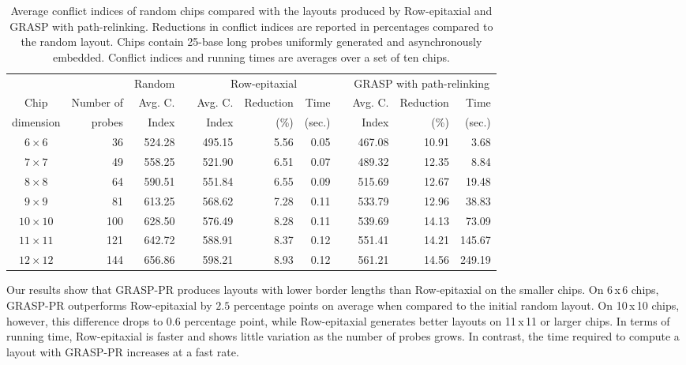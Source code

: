 \documentclass[english]{lni}
\begin{document}
\begin{table}[t]
\caption{Average conflict indices of random chips compared with the layouts produced by
Row-epitaxial and GRASP with path-relinking. Reductions in conflict indices are
reported in percentages compared to the random layout. Chips contain 25-base
long probes uniformly generated and asynchronously embedded. Conflict indices and
running times are averages over a set of ten chips.\label{tab:graspr_reptx_ci}}
\vspace*{2ex}
\scriptsize{
\begin{tabular}{crrcrrrcrrr}
          &            & Random & & \multicolumn{3}{c}{Row-epitaxial}  & & \multicolumn{3}{c}{GRASP with path-relinking}  \\ \cline{3-3} \cline{5-7} \cline{9-11}
Chip      & Number of  & Avg. C.& & Avg. C.& Reduction & Time          & & Avg. C.& Reduction & Time   \\
dimension & probes     & Index  & & Index  & (\%)      & (sec.)        & & Index  & (\%)      & (sec.) \\
\hline
$6\times 6$   &  36 & 524.28 & & 495.15 & 5.56 & 0.05 & & 467.08 & 10.91 &   3.68 \\
$7\times 7$   &  49 & 558.25 & & 521.90 & 6.51 & 0.07 & & 489.32 & 12.35 &   8.84 \\
$8\times 8$   &  64 & 590.51 & & 551.84 & 6.55 & 0.09 & & 515.69 & 12.67 &  19.48 \\
$9\times 9$   &  81 & 613.25 & & 568.62 & 7.28 & 0.11 & & 533.79 & 12.96 &  38.83 \\
$10\times 10$ & 100 & 628.50 & & 576.49 & 8.28 & 0.11 & & 539.69 & 14.13 &  73.09 \\
$11\times 11$ & 121 & 642.72 & & 588.91 & 8.37 & 0.12 & & 551.41 & 14.21 & 145.67 \\
$12\times 12$ & 144 & 656.86 & & 598.21 & 8.93 & 0.12 & & 561.21 & 14.56 & 249.19 \\
\hline
\end{tabular}}
\end{table}

Our results show that GRASP-PR produces layouts with lower border lengths than
Row-epitaxial on the smaller chips. On 6\,x\,6 chips, GRASP-PR
outperforms Row-epitaxial by $2.5$ percentage points on average when compared to
the initial random layout. On 10\,x\,10 chips, however, this difference drops to
$0.6$ percentage point, while Row-epitaxial generates better layouts on 11\,x\,11
or larger chips.
In terms of running time, Row-epitaxial is faster and shows little variation
as the number of probes grows. In contrast, the time required to compute a
layout with GRASP-PR increases at a fast rate.
\end{document}
